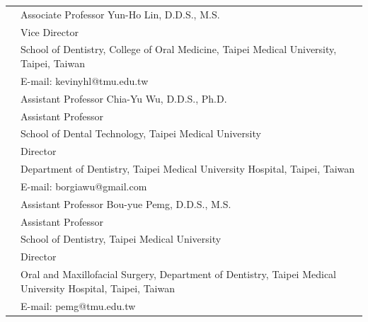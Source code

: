 \documentclass[letterpaper, 11pt]{article}
\begin{document}
\begin{longtable}{p{1.3in}p{4.8in}}



\nohyphens{\color{OliveGreen}{References}} 
& Associate Professor Yun-Ho Lin, D.D.S., M.S.\\
& Vice Director\\
& School of Dentistry, College of Oral Medicine, Taipei Medical University,
Taipei, Taiwan\\
& E-mail: kevinyhl@tmu.edu.tw\\[0.5cm]


& Assistant Professor Chia-Yu Wu, D.D.S., Ph.D.\\
& Assistant Professor\\
& School of Dental Technology, Taipei Medical University\\
& Director\\
& Department of Dentistry,
Taipei Medical University Hospital,
Taipei, Taiwan\\
& E-mail: borgiawu@gmail.com\\[0.5cm]

& Assistant Professor Bou-yue Pemg, D.D.S., M.S.\\
& Assistant Professor\\
& School of Dentistry, Taipei Medical University\\
& Director\\
& Oral and Maxillofacial Surgery, Department of Dentistry,
Taipei Medical University Hospital,
Taipei, Taiwan\\
& E-mail: pemg@tmu.edu.tw\\[0.5cm]


\end{longtable}
\end{document}
